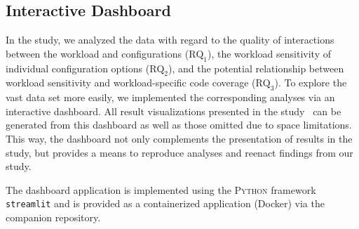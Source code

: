 \documentclass[10pt,conference]{IEEEtran}
\begin{document}
	\subsection{Interactive Dashboard}
	In the study, we analyzed the data with regard to the quality of interactions between the workload and configurations ($\text{RQ}_\text{1}$), the workload sensitivity of individual configuration options ($\text{RQ}_\text{2}$), and the potential relationship between workload sensitivity and workload-specific code coverage ($\text{RQ}_\text{3}$). To explore the vast data set more easily, we implemented the corresponding analyses via an interactive dashboard. All result visualizations presented in the study~\cite{muhlbauer_workload_2023} can be generated from this dashboard as well as those omitted due to space limitations. This way, the dashboard not only complements the presentation of results in the study, but provides a means to reproduce analyses and reenact findings from our study.
	
	The dashboard application is implemented using the \textsc{Python} framework \texttt{streamlit} and is provided as a containerized application (Docker) via the companion repository.
	
	
	
	
\end{document}
